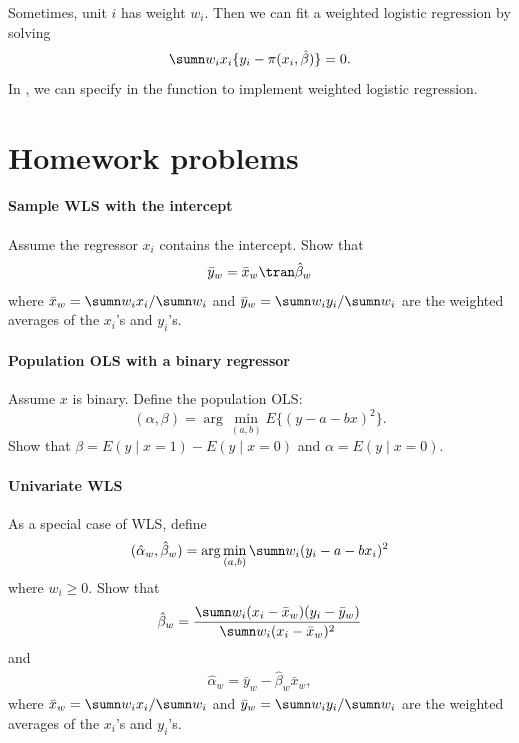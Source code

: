 Sometimes, unit $i$ has weight $w_i$. Then we can fit a weighted logistic regression by solving
$$
\sumn  w_i x_i  \{ y_i - \pi(x_{i}, \hat\beta)\} = 0.
$$
In , we can specify  in the  function to implement weighted logistic regression. 







\section{Homework problems}


 


\paragraph{Sample WLS with the intercept}\label{hw::sample-ols-intercept}

Assume the regressor $x_i$ contains the intercept. Show that 
\begin{equation}\label{eq::OLS-mean-data}
\bar{y}_w = \bar{x}_w\tran \hat{\beta}_w
\end{equation}
where $ \bar{x}_w =  \sumn w_i  x_i / \sumn w_i $ and $ \bar{y}_w =  \sumn w_i  y_i / \sumn w_i $ are the weighted averages of the $x_i$'s and $y_i$'s. 


\paragraph{Population OLS with a binary regressor}\label{problem::pols-binary}


Assume $x$ is binary. Define the population OLS: 
$$
(\alpha, \beta)  = \arg\min_{(a,b)} E \{  (y - a - bx)^2 \} .
$$
Show that $\beta = E(y\mid x=1) - E(y\mid x=0)$ and $\alpha = E(y\mid x=0)$. 


\paragraph{Univariate WLS}\label{hw::wls-uni-binary}

As a special case of WLS, define 
$$
(\hat \alpha_w, \hat \beta_w  ) = \arg\min_{(a,b)} \sumn w_i(y_i - a - b x_i)^2
$$
where $w_i\geq 0$. Show that
\begin{eqnarray}\label{eq::wls-beta}
 \hat \beta_w  = \frac{  \sumn w_i (x_i -  \bar{x}_w) (y_i - \bar{y}_w) }{  \sumn w_i (x_i - \bar{x}_w)^2 }
\end{eqnarray}
and 
\begin{eqnarray}\label{eq::wls-alpha}
\hat \alpha_w = \bar{y}_w -  \hat \beta_w \bar{x}_w,
\end{eqnarray}
where $ \bar{x}_w =  \sumn w_i  x_i / \sumn w_i $ and $ \bar{y}_w =  \sumn w_i  y_i / \sumn w_i $ are the weighted averages of the $x_i$'s and $y_i$'s. 



